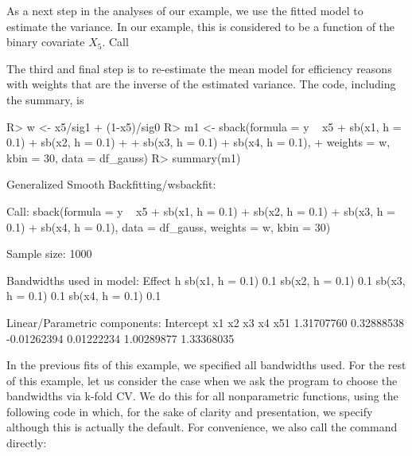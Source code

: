 As a next step in the analyses of our example, we use the fitted model to estimate the variance. In our example, this is considered to be a function of the binary covariate $X_5$.
Call

\begin{Schunk}
\end{Schunk}

The third and final step is to re-estimate the mean model for efficiency reasons with weights that are the inverse of the estimated variance. The code, including the summary, is

\begin{Schunk}
\begin{Sinput}
R>  w <- x5/sig1 + (1-x5)/sig0
R>  m1 <- sback(formula = y ~ x5 + sb(x1, h = 0.1) + sb(x2, h = 0.1) +  
+ 	sb(x3, h = 0.1) + sb(x4, h = 0.1), 
+	weights = w, kbin = 30, data = df_gauss)
R> summary(m1)
\end{Sinput}
\begin{Soutput}
Generalized Smooth Backfitting/wsbackfit:

Call: sback(formula = y ~ x5 + sb(x1, h = 0.1) + sb(x2, h = 0.1) + 
    sb(x3, h = 0.1) + sb(x4, h = 0.1), data = df_gauss, weights = w, 
    kbin = 30)

Sample size: 1000 

Bandwidths used in model:
 Effect          h  
 sb(x1, h = 0.1) 0.1
 sb(x2, h = 0.1) 0.1
 sb(x3, h = 0.1) 0.1
 sb(x4, h = 0.1) 0.1

Linear/Parametric components:
  Intercept          x1          x2          x3          x4         x51 
 1.31707760  0.32888538 -0.01262394  0.01222234  1.00289877  1.33368035 
\end{Soutput}
\end{Schunk}


In the previous fits of this example, we specified all bandwidths used. For the rest of this example, let us consider the case when we ask the program to choose the bandwidths via k-fold CV. We do this for all nonparametric functions, using the following code in which, for the sake of clarity and presentation, we specify  although this is actually the default.
For convenience, we also call the  command directly:

